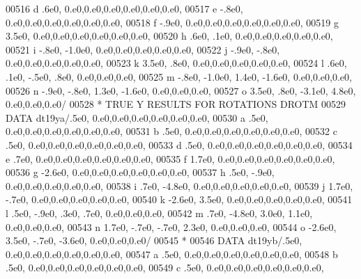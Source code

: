 \begin{DoxyCode}
00516      d            .6e0,                  0.e0,0.e0,0.e0,0.e0,0.e0,0.e0,
00517      e           -.8e0,                  0.e0,0.e0,0.e0,0.e0,0.e0,0.e0,
00518      f           -.9e0,                  0.e0,0.e0,0.e0,0.e0,0.e0,0.e0,
00519      g           3.5e0,                  0.e0,0.e0,0.e0,0.e0,0.e0,0.e0,
00520      h            .6e0,   .1e0,             0.e0,0.e0,0.e0,0.e0,0.e0,
00521      i           -.8e0, -1.0e0,             0.e0,0.e0,0.e0,0.e0,0.e0,
00522      j           -.9e0,  -.8e0,             0.e0,0.e0,0.e0,0.e0,0.e0,
00523      k           3.5e0,   .8e0,             0.e0,0.e0,0.e0,0.e0,0.e0,
00524      l            .6e0,   .1e0,  -.5e0,   .8e0,          0.e0,0.e0,0.e0,
00525      m           -.8e0, -1.0e0,  1.4e0, -1.6e0,          0.e0,0.e0,0.e0,
00526      n           -.9e0,  -.8e0,  1.3e0, -1.6e0,          0.e0,0.e0,0.e0,
00527      o           3.5e0,   .8e0, -3.1e0,  4.8e0,          0.e0,0.e0,0.e0/
00528 \textcolor{comment}{*                        TRUE Y RESULTS FOR ROTATIONS DROTM}
00529       \textcolor{keyword}{DATA} dt19ya/.5e0,                  0.e0,0.e0,0.e0,0.e0,0.e0,0.e0,
00530      a            .5e0,                  0.e0,0.e0,0.e0,0.e0,0.e0,0.e0,
00531      b            .5e0,                  0.e0,0.e0,0.e0,0.e0,0.e0,0.e0,
00532      c            .5e0,                  0.e0,0.e0,0.e0,0.e0,0.e0,0.e0,
00533      d            .5e0,                  0.e0,0.e0,0.e0,0.e0,0.e0,0.e0,
00534      e            .7e0,                  0.e0,0.e0,0.e0,0.e0,0.e0,0.e0,
00535      f           1.7e0,                  0.e0,0.e0,0.e0,0.e0,0.e0,0.e0,
00536      g          -2.6e0,                  0.e0,0.e0,0.e0,0.e0,0.e0,0.e0,
00537      h            .5e0,  -.9e0,             0.e0,0.e0,0.e0,0.e0,0.e0,
00538      i            .7e0, -4.8e0,             0.e0,0.e0,0.e0,0.e0,0.e0,
00539      j           1.7e0,  -.7e0,             0.e0,0.e0,0.e0,0.e0,0.e0,
00540      k          -2.6e0,  3.5e0,             0.e0,0.e0,0.e0,0.e0,0.e0,
00541      l            .5e0,  -.9e0,   .3e0,   .7e0,          0.e0,0.e0,0.e0,
00542      m            .7e0, -4.8e0,  3.0e0,  1.1e0,          0.e0,0.e0,0.e0,
00543      n           1.7e0,  -.7e0,  -.7e0,  2.3e0,          0.e0,0.e0,0.e0,
00544      o          -2.6e0,  3.5e0,  -.7e0, -3.6e0,          0.e0,0.e0,0.e0/
00545 \textcolor{comment}{*}
00546       \textcolor{keyword}{DATA} dt19yb/.5e0,                  0.e0,0.e0,0.e0,0.e0,0.e0,0.e0,
00547      a            .5e0,                  0.e0,0.e0,0.e0,0.e0,0.e0,0.e0,
00548      b            .5e0,                  0.e0,0.e0,0.e0,0.e0,0.e0,0.e0,
00549      c            .5e0,                  0.e0,0.e0,0.e0,0.e0,0.e0,0.e0,

\end{DoxyCode}
